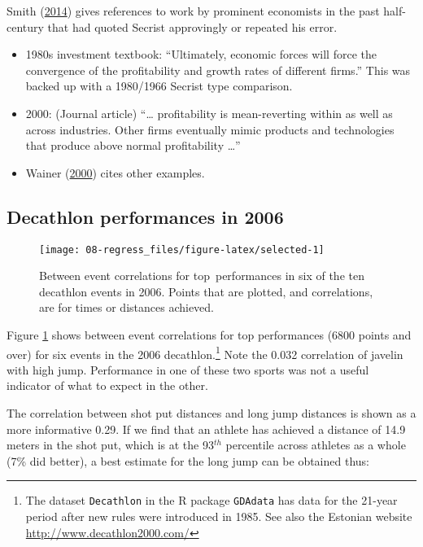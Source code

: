 \documentclass[
  10ptls,
  b5paper]{book}
\providecommand{\tightlist}{%
  \setlength{\itemsep}{0pt}\setlength{\parskip}{0pt}}
\begin{document}
Smith (\protect\hyperlink{ref-smith-sd}{2014}) gives references to work by prominent economists in the past half-century that had quoted Secrist approvingly or repeated his error.

\begin{itemize}
\tightlist
\item
  1980s investment textbook: ``Ultimately, economic forces will force the convergence of the profitability and growth rates of different firms.'' This was backed up with a 1980/1966 Secrist type comparison.
\item
  2000: (Journal article) ``\ldots{} profitability is mean-reverting within as well as across industries. Other firms eventually mimic products and technologies that produce above normal profitability \ldots{}''
\item
  Wainer (\protect\hyperlink{ref-wainerRegress}{2000}) cites other examples.
\end{itemize}

\hypertarget{decathlon-performances-in-2006}{%
\subsection*{Decathlon performances in 2006}\label{decathlon-performances-in-2006}}

\begin{figure}[H]

{\centering \texttt{[image: 08-regress\_files/figure-latex/selected-1]} 

}

\caption{Between event correlations for top performances in six
of the ten decathlon events in 2006.  Points that are plotted,
and correlations, are for times or distances achieved.}\label{fig:selected}
\end{figure}

Figure \ref{fig:selected} shows between event correlations for top performances (6800 points and over) for six events in the 2006 decathlon.\footnote{The dataset \texttt{Decathlon} in the R package \texttt{GDAdata} has data for the 21-year period after new rules were introduced in 1985. See also the Estonian website \url{http://www.decathlon2000.com/}} Note the 0.032 correlation of javelin with high jump. Performance in one of these two sports was not a useful indicator of what to expect in the other.

The correlation between shot put distances and long jump distances is shown as a more informative 0.29. If we find that an athlete has achieved a distance of 14.9 meters in the shot put, which is at the 93\(^{th}\) percentile across athletes as a whole (7\% did better), a best estimate for the long jump can be obtained thus:
\end{document}
